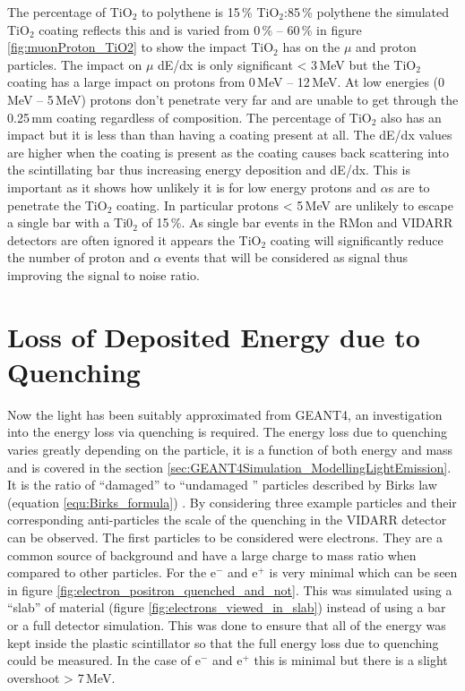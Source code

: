 
The percentage of TiO$_2$ to polythene is 15\,\% TiO$_2$:85\,\% polythene \cite{aliaga2014design} \cite{Pla-Dalmau2014} the simulated TiO$_2$ coating reflects this and is varied from 0\,\% -- 60\,\% in figure \ref{fig:muonProton_TiO2} to show the impact TiO$_2$ has on the $\mu$ and proton particles. The impact on $\mu$ dE/dx is only significant < 3\,MeV but the TiO$_2$ coating has a large impact on protons from 0\,MeV -- 12\,MeV. At low energies (0\,MeV -- 5\,MeV) protons don't penetrate very far and are unable to get through the 0.25\,mm coating regardless of composition. The percentage of TiO$_2$ also has an impact but it is less than than having a coating present at all. The dE/dx values are higher when the coating is present as the coating causes back scattering into the scintillating bar thus increasing energy deposition and dE/dx. This is important as it shows how unlikely it is for low energy protons and $\alpha$s are to penetrate the TiO$_2$ coating. In particular protons < 5\,MeV are unlikely to escape a single bar with a Ti0$_2$ of 15\,\%. As single bar events in the RMon and VIDARR detectors are often ignored it appears the TiO$_2$ coating will significantly reduce the number of proton and $\alpha$ events that will be considered as signal thus improving the signal to noise ratio. 

\section{Loss of Deposited Energy due to Quenching}\label{sec:GEANT4Simulation_quenchingLoss}
Now the light has been suitably approximated from GEANT4, an investigation into the energy loss via quenching is required. The energy loss due to quenching varies greatly depending on the particle, it is a function of both energy and mass and is covered in the section \ref{sec:GEANT4Simulation_ModellingLightEmission}. It is the ratio of ``damaged'' to ``undamaged '' particles \cite{craun_1970} described by Birks law (equation \ref{equ:Birks_formula}) \cite{knoll_2010}. By considering three example particles and their corresponding anti-particles the scale of the quenching in the VIDARR detector can be observed. The first particles to be considered were electrons. They are a common source of background and have a large charge to mass ratio when compared to other particles. For the e$^-$ and e$^+$ is very minimal which can be seen in figure \ref{fig:electron_positron_quenched_and_not}. This was simulated using a ``slab'' of material (figure \ref{fig:electrons_viewed_in_slab}) instead of using a bar or a full detector simulation. This was done to ensure that all of the energy was kept inside the plastic scintillator so that the full energy loss due to quenching could be measured. In the case of e$^-$ and e$^+$ this is minimal but there is a slight overshoot > 7\,MeV. 

